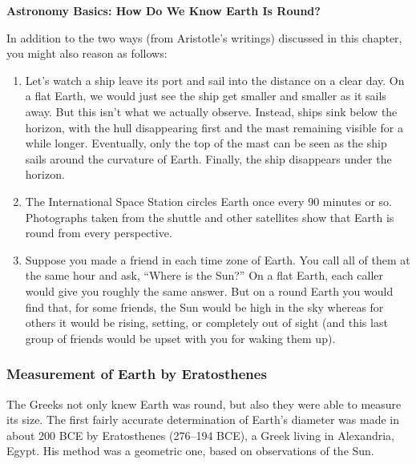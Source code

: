 \documentclass[../../main-astronomy.tex]{subfiles}
\begin{document}
\begin{mdframed}[backgroundcolor=black!10]
    \textbf{Astronomy Basics: How Do We Know Earth Is Round?}
    
    \vspace{1ex}
    
    In addition to the two ways (from Aristotle's writings) discussed in this chapter, you might also reason as follows:
    
    \vspace{1ex}

    \begin{enumerate}
    \setlength\itemsep{0.1ex}
        \item Let's watch a ship leave its port and sail into the distance on a clear day. On a flat Earth, we would just see the ship get smaller and smaller as it sails away. But this isn't what we actually observe. Instead, ships sink below the horizon, with the hull disappearing first and the mast remaining visible for a while longer. Eventually, only the top of the mast can be seen as the ship sails around the curvature of Earth. Finally, the ship disappears under the horizon.
        \item  The International Space Station circles Earth once every 90 minutes or so. Photographs taken from the shuttle and other satellites show that Earth is round from every perspective.
        \item Suppose you made a friend in each time zone of Earth. You call all of them at the same hour and ask, ``Where is the Sun?'' On a flat Earth, each caller would give you roughly the same answer. But on a round Earth you would find that, for some friends, the Sun would be high in the sky whereas for others it would be rising, setting, or completely out of sight (and this last group of friends would be upset with you for waking them up).
    \end{enumerate}
\end{mdframed}

\subsubsection*{Measurement of Earth by Eratosthenes}

The Greeks not only knew Earth was round, but also they were able to measure its size. The first fairly accurate determination of Earth's diameter was made in about 200 BCE by Eratosthenes (276--194 BCE), a Greek living in Alexandria, Egypt. His method was a geometric one, based on observations of the Sun.
\end{document}
